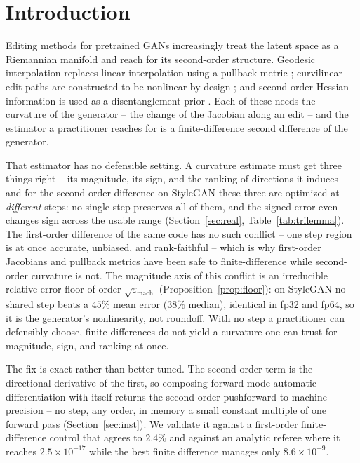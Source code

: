 \documentclass[10pt]{article}
\newcommand{\eps}{\varepsilon}
\begin{document}
\section{Introduction}
\label{sec:intro}
Editing methods for pretrained GANs increasingly treat the latent space as a Riemannian
manifold and reach for its second-order structure. Geodesic interpolation replaces linear
interpolation using a pullback metric \citep{arvanitidis2018,shao2018,chen2018}; curvilinear
edit paths are constructed to be nonlinear by design \citep{aoshima2023}; and second-order
Hessian information is used as a disentanglement prior \citep{peebles2020}. Each of these
needs the curvature of the generator -- the change of the Jacobian along an edit -- and the
estimator a practitioner reaches for is a finite-difference second difference of the
generator.

That estimator has no defensible setting. A curvature estimate must get three things right -- its
magnitude, its sign, and the ranking of directions it induces -- and for the second-order difference on
StyleGAN these three are optimized at \emph{different} steps: no single step preserves all of them, and
the signed error even changes sign across the usable range (Section~\ref{sec:real},
Table~\ref{tab:trilemma}). The first-order difference of the same code has no such conflict -- one step
region is at once accurate, unbiased, and rank-faithful -- which is why first-order Jacobians and pullback
metrics have been safe to finite-difference while second-order curvature is not. The magnitude axis of
this conflict is an irreducible relative-error floor of order $\sqrt{\eps_{\mathrm{mach}}}$
(Proposition~\ref{prop:floor}): on StyleGAN no shared step beats a $45\%$ mean error ($38\%$ median),
identical in fp32 and fp64, so it is the generator's nonlinearity, not roundoff. With no step a
practitioner can defensibly choose, finite differences do not yield a curvature one can trust for
magnitude, sign, and ranking at once.

The fix is exact rather than better-tuned. The second-order term is the directional
derivative of the first, so composing forward-mode automatic differentiation with itself
returns the second-order pushforward to machine precision -- no step, any order, in memory
a small constant multiple of one forward pass (Section~\ref{sec:inst}). We validate it
against a first-order finite-difference control that agrees to $2.4\%$ and against an
analytic referee where it reaches $2.5\times10^{-17}$ while the best finite difference
manages only $8.6\times10^{-9}$.
\end{document}
